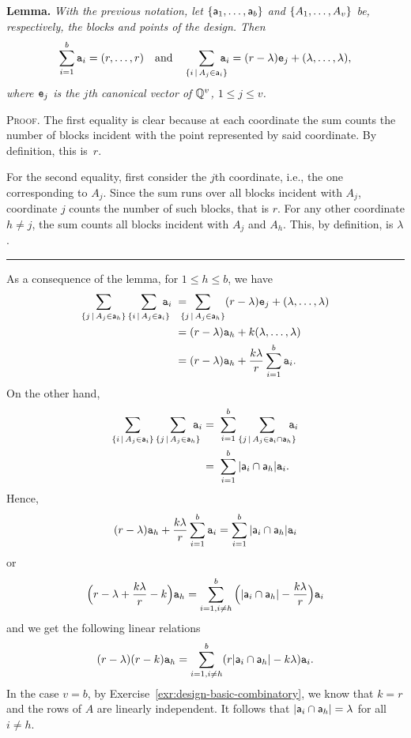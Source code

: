 \begin{solution}
    \textbf{Lemma.} \textit{With the previous notation, let\/ $\{\mathsf a_1,\dots,\mathsf a_b\}$ and\/ $\{A_1,\dots,A_v\}$ be, respectively, the blocks and points of the design. Then}
    \begin{equation}\label{eq:sum-of-inicidence-rows}
        \sum_{i=1}^b\mathtt a_i = (r,\dots,r)
        \quad\text{and}\quad
        \sum_{\{i\,\mid\,A_j\in\mathsf a_i\}}\!\!\!\!\!\mathtt a_i=(r-\lambda)\mathtt e_j+(\lambda,\dots,\lambda),
    \end{equation}
    \textit{where\/ $\mathtt e_j$ is the\/ $j$th canonical vector of\/ $\mathbb{Q}^v$, $1\le j\le v$.}

    \small
    \textsc{Proof.} The first equality is clear because at each coordinate the sum counts the number of blocks incident with the point represented by said coordinate. By definition, this is~$r$.

    For the second equality, first consider the $j$th coordinate, i.e., the one corresponding to $A_j$. Since the sum runs over all blocks incident with $A_j$, coordinate $j$ counts the number of such blocks, that is $r$. For any other coordinate $h\ne j$, the sum counts all blocks incident with $A_j$ and $A_h$. This, by definition, is $\lambda$.\hfill\rule{0.6em}{0.6em}
    
    \normalsize    
    \bigskip
    As a consequence of the lemma, for $1\le h\le b$, we have
    \begin{align*}
        \sum_{\{j\,\mid\,A_j\in\block a_h\}}
            \sum_{\{i\,\mid\,A_j\in\block a_i\}}\!\!\!\!\!\vect a_i
            &\;= \!\!\!\!\!\sum_{\{j\,\mid\,A_j\in\block a_h\}}
                (r-\lambda)\vect e_j+(\lambda,\dots,\lambda)\\
            &\;= (r-\lambda)\vect a_h+k(\lambda,\dots,\lambda)\\
            &\;= (r-\lambda)\vect a_h + \frac{k\lambda}r
                \sum_{i=1}^b\vect a_i.
    \end{align*}
    On the other hand,
    \begin{align*}
    \sum_{\{i\,\mid\,A_j\in\block a_i\}}
            \sum_{\{j\,\mid\,A_j\in\block a_h\}}\!\!\!\!\!\vect a_i
            &=\; \sum_{i=1}^b
                \sum_{\{j\,\mid\,A_j\in\block a_i\cap\block a_h\}}
                \!\!\!\!\!\vect a_i\\
            &=\; \sum_{i=1}^b|\block a_i\cap\block a_h|\vect a_i.
    \end{align*}
    Hence,
    $$
        (r-\lambda)\mathtt a_h + \frac{k\lambda}r
                \sum_{i=1}^b\mathtt a_i
            = \sum_{i=1}^b|\mathsf a_i\cap\mathsf a_h|\mathtt a_i
    $$
    or
    $$
        \Big(r-\lambda +\frac{k\lambda}r-k\Big)\mathtt a_h
            = \sum_{i=1,i\ne h}^b
                \Big(|\mathsf a_i\cap\mathsf a_h|-\frac{k\lambda}r\Big)
                    \mathtt a_i
    $$
    and we get the following linear relations
    $$
        (r-\lambda)(r-k)\mathtt a_h
            = \sum_{i=1,i\ne h}^b
                (r|\mathsf a_i\cap\mathsf a_h|-k\lambda)
                    \mathtt a_i.
    $$
    In the case $v=b$, by Exercise~\ref{exr:design-basic-combinatory}, we know that $k=r$ and the rows of $A$ are linearly independent. It follows that $|\mathsf a_i\cap\mathsf a_h|=\lambda$ for all $i\ne h$.


\end{solution}
